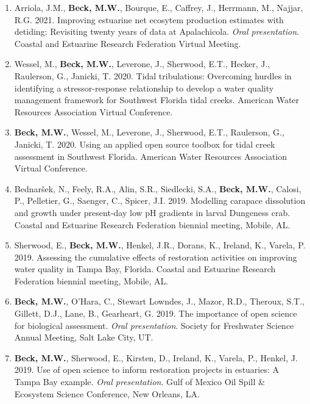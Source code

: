 \documentclass[letterpaper,12pt]{article}
\begin{document}
\begin{enumerate}
\item Arriola, J.M., {\bf Beck, M.W.}, Bourque, E., Caffrey, J., Herrmann, M., Najjar, R.G. 2021. Improving estuarine net ecosytem production estimates with detiding: Revisiting twenty years of data at Apalachicola. \textit{Oral presentation}. Coastal and Estuarine Research Federation Virtual Meeting.

\item Wessel, M., \textbf{Beck, M.W.}, Leverone, J., Sherwood, E.T., Hecker, J., Raulerson, G., Janicki, T. 2020. Tidal tribulations: Overcoming hurdles in identifying a stressor-response relationship to develop a water quality management framework for Southwest Florida tidal creeks. American Water Resources Association Virtual Conference. 

\item \textbf{Beck, M.W.}, Wessel, M., Leverone, J., Sherwood, E.T., Raulerson, G., Janicki, T. 2020. Using an applied open source toolbox for tidal creek assessment in Southwest Florida. American Water Resources Association Virtual Conference. 

\item Bednar\v{s}ek, N., Feely, R.A., Alin, S.R., Siedlecki, S.A., \textbf{Beck, M.W.}, Calosi, P., Pelletier, G., Saenger, C., Spicer, J.I. 2019. Modelling carapace dissolution and growth under present-day low pH gradients in larval Dungeness crab.  Coastal and Estuarine Research Federation biennial meeting, Mobile, AL.

\item Sherwood, E., \textbf{Beck, M.W.}, Henkel, J.R., Dorans, K., Ireland, K., Varela, P. 2019. Assessing the cumulative effects of restoration activities on improving water quality in Tampa Bay, Florida.  Coastal and Estuarine Research Federation biennial meeting, Mobile, AL.

\item \textbf{Beck, M.W.}, O'Hara, C., Stewart Lowndes, J., Mazor, R.D., Theroux, S.T., Gillett, D.J., Lane, B., Gearheart, G. 2019. The importance of open science for biological assessment. \textit{Oral presentation}. Society for Freshwater Science Annual Meeting, Salt Lake City, UT.

\item {\bf Beck, M.W.}, Sherwood, E., Kirsten, D., Ireland, K., Varela, P., Henkel, J. 2019. Use of open science to inform restoration projects in estuaries: A Tampa Bay example. \textit{Oral presentation}. Gulf of Mexico Oil Spill \& Ecosystem Science Conference, New Orleans, LA.


\end{enumerate}
\end{document}
